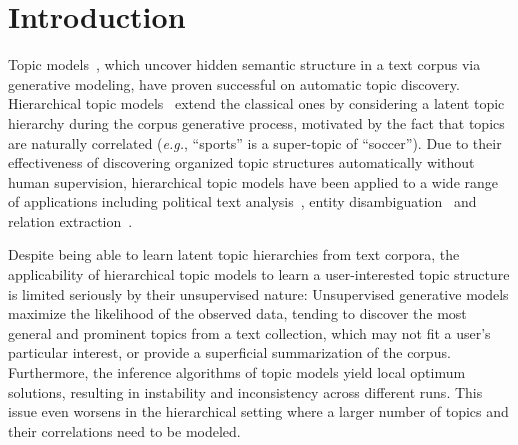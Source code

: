 \documentclass[sigconf]{acmart}
\newcommand{\eg}{\emph{e.g.}}
\theoremstyle{definition}
\begin{document}




\maketitle



\section{Introduction}
Topic models~\cite{Blei2003LatentDA,Hofmann1999ProbabilisticLS}, which uncover hidden semantic structure in a text corpus via generative modeling, have proven successful on automatic topic discovery. Hierarchical topic models~\cite{Blei2003HierarchicalTM,Mimno2007MixturesOH} extend the classical ones by considering a latent topic hierarchy during the corpus generative process, motivated by the fact that topics are naturally correlated (\eg, ``sports'' is a super-topic of ``soccer''). Due to their effectiveness of discovering organized topic structures automatically without human supervision, hierarchical topic models have been applied to a wide range of applications including political text analysis~\cite{grimmer2010bayesian}, entity disambiguation~\cite{kataria2011entity} and relation extraction~\cite{Alfonseca2012PatternLF}.

Despite being able to learn latent topic hierarchies from text corpora, the applicability of hierarchical topic models to learn a user-interested topic structure is limited seriously by their unsupervised nature: Unsupervised generative models maximize the likelihood of the observed data, tending to discover the most general and prominent topics from a text collection, which may not fit a user's particular interest, or provide a superficial summarization of the corpus. Furthermore, the inference algorithms of topic models yield local optimum solutions, resulting in instability and inconsistency across different runs. This issue even worsens in the hierarchical setting where a larger number of topics and their correlations need to be modeled.
\end{document}
